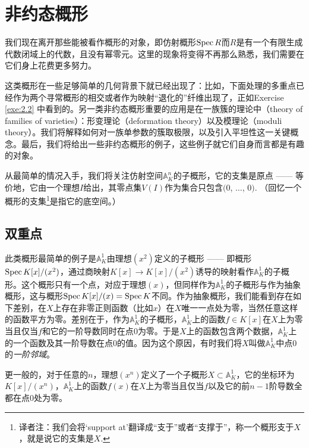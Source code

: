 \section{非约态概形}

我们现在离开那些能被看作概形的对象，即仿射概形$\operatorname{Spec} R$而$R$是有一个有限生成代数闭域上的代数，且没有幂零元。这里的现象将变得不再那么熟悉，我们需要在它们身上花费更多努力。

这类概形在一些足够简单的几何背景下就已经出现了：比如，下面处理的多重点已经作为两个寻常概形的相交或者作为映射“退化的”纤维出现了，正如Exercise \ref{exe:2.2} 中看到的。另一类非约态概形重要的应用是在一族簇的理论中（theory of families of varieties）：形变理论（deformation theory）以及模理论（moduli theory）。我们将解释如何对一族单参数的簇取极限，以及引入平坦性这一关键概念。最后，我们将给出一些非约态概形的例子，这些例子就它们自身而言都是有趣的对象。

从最简单的情况入手，我们将关注仿射空间$\mathbb{A}_K^n$的子概形，它的支集是原点 ------ 等价地，它由一个理想$I$给出，其零点集$V(I)$作为集合只包含$(0$, $\dots$, $0)$. （回忆一个概形的支集\footnote{译者注：我们会将`support at'翻译成“支于”或者“支撑于”，称一个概形支于$X$，就是说它的支集是$X$.}是指它的底空间。）

\subsection{双重点}\label{s:2.3.1}
\begin{exa}
	此类概形最简单的例子是$\mathbb{A}_K^1$由理想$(x^2)$定义的子概形 ------ 即概形$\operatorname{Spec} K[x]/(x^2)$，通过商映射$K[x]\to K[x]/(x^2)$诱导的映射看作$\mathbb{A}_K^1$的子概形。这个概形只有一个点，对应于理想$(x)$，但同样作为$\mathbb{A}_K^1$的子概形与作为抽象概形，这与概形$\operatorname{Spec} K[x]/(x)=\operatorname{Spec} K$不同。作为抽象概形，我们能看到存在如下差别，在$X$上存在非零正则函数（比如$x$）在$X$唯一一点处为零，当然任意这样的函数平方为零。差别在于，作为$\mathbb{A}_K^1$的子概形，$\mathbb{A}_K^1$上的函数$f\in K[x]$在$X$上为零当且仅当$f$和它的一阶导数同时在点$0$为零。于是$X$上的函数包含两个数据，$\mathbb{A}_K^1$上的一个函数及其一阶导数在点$0$的值。因为这个原因，有时我们将$X$叫做$\mathbb{A}_K^1$中点$0$的\textit{一阶邻域}。
\end{exa}

更一般的，对于任意的$n$，理想$(x^n)$定义了一个子概形$X\subset \mathbb{A}_K^1$，它的坐标环为$K[x]/(x^n)$，$\mathbb{A}_K^1$上的函数$f(x)$在$X$上为零当且仅当$f$以及它的前$n-1$阶导数全都在点$0$处为零。

